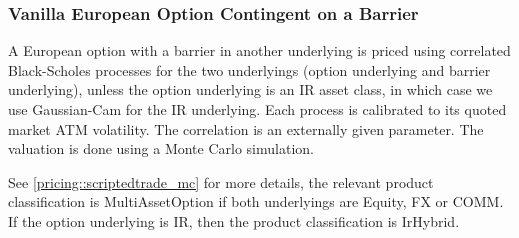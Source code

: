 \subsubsection{Vanilla European Option Contingent on a Barrier}
\label{pricing::europeanoptionbarrier}

A European option with a barrier in another underlying is priced using correlated Black-Scholes processes for the two underlyings
(option underlying and barrier underlying), unless the option underlying is an IR asset class, in which case we use Gaussian-Cam
for the IR underlying. Each process is calibrated to its quoted market ATM volatility. The correlation is an externally given parameter.
The valuation is done using a Monte Carlo simulation.

See \ref{pricing::scriptedtrade_mc} for more details, the relevant product classification is MultiAssetOption if both underlyings
are Equity, FX or COMM. If the option underlying is IR, then the product classification is IrHybrid.